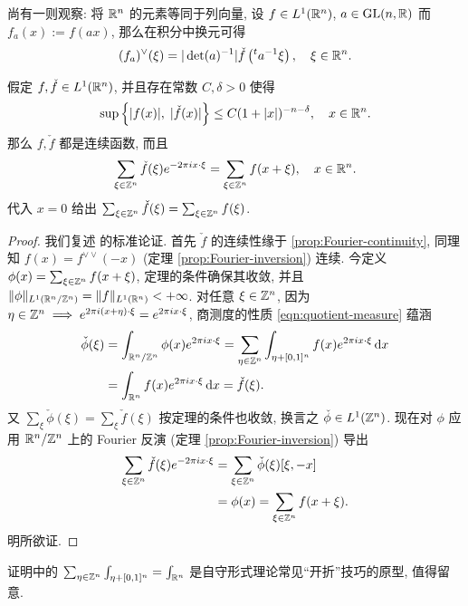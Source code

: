 尚有一则观察: 将 $\mathbb{R}^n$ 的元素等同于列向量, 设 $f \in L^1(\mathbb{R}^n)$, $a \in \operatorname{GL}(n, \mathbb{R})$ 而 $f_a(x) := f(ax)$, 那么在积分中换元可得
\begin{equation}\label{eqn:Fourier-dilation}
	(f_a)^\vee(\xi) = |\det(a)^{-1}| \check{f}\left({}^t a^{-1}\xi\right), \quad \xi \in \mathbb{R}^n.
\end{equation}

\begin{theorem}\label{prop:Poisson-sum} 
	假定 $f, \check{f} \in L^1(\mathbb{R}^n)$, 并且存在常数 $C, \delta > 0$ 使得
	\[ \sup\left\{ |f(x)|, \; |\check{f}(x)| \right\} \leq C(1 + |x|)^{-n-\delta}, \quad x \in \mathbb{R}^n. \]
	那么 $f, \check{f}$ 都是连续函数, 而且
	\[ \sum_{\xi \in \mathbb{Z}^n} \check{f}(\xi) e^{-2\pi ix \cdot \xi} = \sum_{\xi \in \mathbb{Z}^n} f(x + \xi), \quad x \in \mathbb{R}^n. \]
	代入 $x=0$ 给出 $\sum_{\xi \in \mathbb{Z}^n} \check{f}(\xi) = \sum_{\xi \in \mathbb{Z}^n} f(\xi)$.
\end{theorem}
\begin{proof}
	我们复述 \cite[Theorem 3.1.17]{Gra14} 的标准论证. 首先 $\check{f}$ 的连续性缘于 \ref{prop:Fourier-continuity}, 同理知 $f(x) = f^{\vee \vee}(-x)$ (定理 \ref{prop:Fourier-inversion}) 连续. 今定义 $\phi(x) = \sum_{\xi \in \mathbb{Z}^n} f(x+\xi)$, 定理的条件确保其收敛, 并且 $\|\phi\|_{L^1(\mathbb{R}^n/\mathbb{Z}^n)} = \|f\|_{L^1(\mathbb{R}^n)} < +\infty$. 对任意 $\xi \in \mathbb{Z}^n$, 因为 $\eta \in \mathbb{Z}^n \implies e^{2\pi i(x+\eta)\cdot\xi} = e^{2\pi ix \cdot \xi}$, 商测度的性质 \eqref{eqn:quotient-measure} 蕴涵
	\begin{align*}
		\check{\phi}(\xi) & = \int_{\mathbb{R}^n/\mathbb{Z}^n} \phi(x) e^{2\pi ix \cdot \xi} = \sum_{\eta \in \mathbb{Z}^n} \int_{\eta + [0,1]^n} f(x) e^{2\pi ix \cdot \xi} \mathop{}\!\mathrm{d} x \\
		& = \int_{\mathbb{R}^n} f(x) e^{2\pi ix \cdot \xi} \mathop{}\!\mathrm{d} x = \check{f}(\xi).
	\end{align*}
	又 $\sum_\xi \check{\phi}(\xi) = \sum_\xi \check{f}(\xi)$ 按定理的条件也收敛, 换言之 $\check{\phi} \in L^1(\mathbb{Z}^n)$. 现在对 $\phi$ 应用 $\mathbb{R}^n/\mathbb{Z}^n$ 上的 Fourier 反演 (定理 \ref{prop:Fourier-inversion}) 导出
	\begin{align*}
		\sum_{\xi \in \mathbb{Z}^n} \check{f}(\xi) e^{-2\pi ix \cdot \xi} & = \sum_{\xi \in \mathbb{Z}^n} \check{\phi}(\xi) [\xi, -x] \\
		& = \phi(x) = \sum_{\xi \in \mathbb{Z}^n} f(x + \xi).
	\end{align*}
	明所欲证.
\end{proof}

证明中的 $\sum_{\eta \in \mathbb{Z}^n} \int_{\eta + [0,1]^n} = \int_{\mathbb{R}^n}$ 是自守形式理论常见``开折''技巧的原型, 值得留意. 

